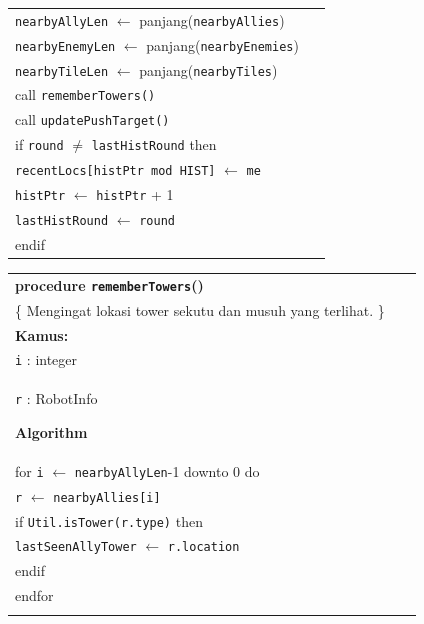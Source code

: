 \documentclass{article}
\newenvironment{pseudobox}
{
\centering
\begin{longtable}{|p{0.94\linewidth}|}
\hline
}
{
\\ \hline
\end{longtable}
\vspace{0.05cm}
}
\begin{document}
\begin{enumerate}[label=\alph*.]
\begin{enumerate}[label=\alph*.]
\begin{pseudobox}
\hspace*{1.5em}\texttt{nearbyAllyLen} $\leftarrow$ panjang(\texttt{nearbyAllies}) \\
\hspace*{1.5em}\texttt{nearbyEnemyLen} $\leftarrow$ panjang(\texttt{nearbyEnemies}) \\
\hspace*{1.5em}\texttt{nearbyTileLen} $\leftarrow$ panjang(\texttt{nearbyTiles}) \\

\hspace*{1.5em}call \texttt{rememberTowers()} \\
\hspace*{1.5em}call \texttt{updatePushTarget()} \\

\hspace*{1.5em}if \texttt{round} $\neq$ \texttt{lastHistRound} then \\
\hspace*{3em}\texttt{recentLocs[histPtr mod HIST]} $\leftarrow$ \texttt{me} \\
\hspace*{3em}\texttt{histPtr} $\leftarrow$ \texttt{histPtr} + 1 \\
\hspace*{3em}\texttt{lastHistRound} $\leftarrow$ \texttt{round} \\
\hspace*{1.5em}endif
\end{pseudobox}

\begin{pseudobox}
\textbf{procedure \texttt{rememberTowers}()} \\
\{ Mengingat lokasi tower sekutu dan musuh yang terlihat. \}\\

\textbf{Kamus:} \\
\hspace*{1.5em}\texttt{i} : integer \\
\hspace*{1.5em}\texttt{r} : RobotInfo

\textbf{Algorithm} \\
\hspace*{1.5em}for \texttt{i} $\leftarrow$ \texttt{nearbyAllyLen}-1 downto 0 do \\
\hspace*{3em}\texttt{r} $\leftarrow$ \texttt{nearbyAllies[i]} \\
\hspace*{3em}if \texttt{Util.isTower(r.type)} then \\
\hspace*{4.5em}\texttt{lastSeenAllyTower} $\leftarrow$ \texttt{r.location} \\
\hspace*{3em}endif \\
\hspace*{1.5em}endfor \\


\end{pseudobox}
\end{enumerate}
\end{enumerate}
\end{document}
